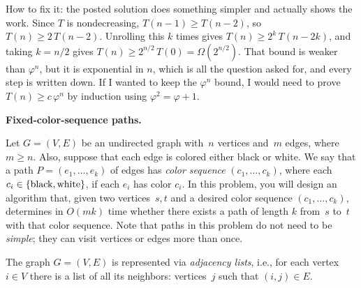 \documentclass[11pt,addpoints,answers]{exam}
\begin{document}
\begin{questions}
\begin{solution}
    How to fix it: the posted solution does something simpler and actually shows the work.
    Since $T$ is nondecreasing, $T(n-1) \ge T(n-2)$, so $T(n) \ge 2\,T(n-2)$.
    Unrolling this $k$ times gives $T(n) \ge 2^{k}\, T(n-2k)$, and taking $k = n/2$ gives $T(n) \ge 2^{n/2}\, T(0) = \Omega(2^{n/2})$.
    That bound is weaker than $\varphi^n$, but it is exponential in $n$, which is all the question asked for, and every step is written down.
    If I wanted to keep the $\varphi^n$ bound, I would need to prove $T(n) \ge c\,\varphi^n$ by induction using $\varphi^2 = \varphi + 1$.
  \end{solution}

\question \textbf{Fixed-color-sequence paths.} 
    
 
  Let $G=(V,E)$ be an undirected graph with~$n$ vertices and~$m$ edges, where $m \geq n$.
  Also, suppose that each edge is colored either black or white.
  We say that a path $P=(e_{1},\dots,e_{k})$ of edges has \emph{color sequence} $(c_{1},\dots,c_{k})$, where each $c_{i}\in\left\{\text{black},\text{white}\right\}$, if each $e_{i}$ has color $c_{i}$.
      In this problem, you will design an algorithm that, given two vertices~$s,t$ and a desired color sequence $(c_{1},\dots,c_{k})$, determines in $O(mk)$ time whether there exists a path of length $k$ from~$s$ to~$t$ with that color sequence.
  Note that paths in this problem do not need to be \emph{simple}; they can visit vertices or edges more than once.

  The graph $G=(V,E)$ is represented via \emph{adjacency lists}, i.e., for each vertex $i \in V$ there is a list of all its neighbors: vertices~$j$ such that $(i,j) \in E$.

\end{questions}
\end{document}
